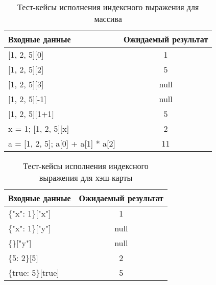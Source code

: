 \begin{table}[!ht]
    \Large
    \centering
    \begin{threeparttable}
        \caption{Тест-кейсы исполнения индексного выражения для массива}
        \label{t:testCases_arrayIndexExpr}
        \begin{tabularx}{\textwidth}{|X|c|}
            \hline
            Входные данные                                    & Ожидаемый результат \\
            \hline
            {[}1, 2, 5{]}{[}0{]}                              & 1                   \\
            \hline
            {[}1, 2, 5{]}{[}2{]}                              & 5                   \\
            \hline
            {[}1, 2, 5{]}{[}3{]}                              & null                \\
            \hline
            {[}1, 2, 5{]}{[}-1{]}                             & null                \\
            \hline
            {[}1, 2, 5{]}{[}1+1{]}                            & 5                   \\
            \hline
            x = 1; {[}1, 2, 5{]}{[}x{]}                       & 2                   \\
            \hline
            a = {[}1, 2, 5{]}; a{[}0{]} + a{[}1{]} * a{[}2{]} & 11                  \\
            \hline
        \end{tabularx}
    \end{threeparttable}
    \vspace{\bottompaddingoftable}
\end{table}

\begin{table}[!ht]
    \Large
    \centering
    \begin{threeparttable}
        \caption{Тест-кейсы исполнения индексного выражения для хэш-карты}
        \label{t:testCases_HashMapIndexExpr}
        \begin{tabularx}{\textwidth}{|X|c|}
            \hline
            Входные данные                                    & Ожидаемый результат \\
            \hline
            \{"x": 1\}{[}"x"{]}   & 1    \\
            \hline
            \{"x": 1\}{[}"y"{]}   & null \\
            \hline
            \{\}{[}"y"{]}         & null \\
            \hline
            \{5: 2\}{[}5{]}       & 2    \\
            \hline
            \{true: 5\}{[}true{]} & 5    \\
            \hline
        \end{tabularx}
    \end{threeparttable}
    \vspace{\bottompaddingoftable}
\end{table}